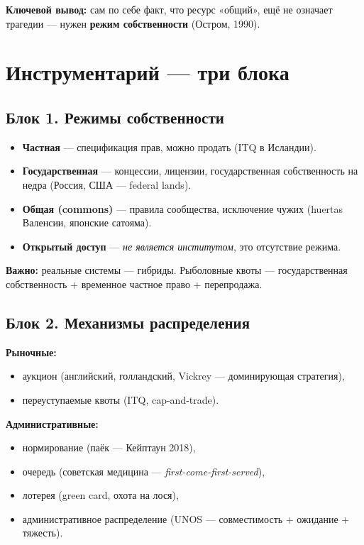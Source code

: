 \documentclass[12pt]{article}
\begin{document}
\textbf{Ключевой вывод:} сам по себе факт, что ресурс «общий», ещё не означает трагедии — нужен \textbf{режим собственности} (Остром, 1990).

\section{Инструментарий — три блока}

\subsection{Блок 1. Режимы собственности}
\begin{itemize}
\item \textbf{Частная} — спецификация прав, можно продать (ITQ в Исландии).
\item \textbf{Государственная} — концессии, лицензии, государственная собственность на недра (Россия, США — federal lands).
\item \textbf{Общая (commons)} — правила сообщества, исключение чужих (huertas Валенсии, японские сатояма).
\item \textbf{Открытый доступ} — \emph{не является институтом}, это отсутствие режима.
\end{itemize}

\textbf{Важно:} реальные системы — гибриды. Рыболовные квоты — государственная собственность + временное частное право + перепродажа.

\subsection{Блок 2. Механизмы распределения}
\textbf{Рыночные:}
\begin{itemize}
\item аукцион (английский, голландский, Vickrey — доминирующая стратегия),
\item переуступаемые квоты (ITQ, cap-and-trade).
\end{itemize}

\textbf{Административные:}
\begin{itemize}
\item нормирование (паёк — Кейптаун 2018),
\item очередь (советская медицина — \emph{first-come-first-served}),
\item лотерея (green card, охота на лося),
\item административное распределение (UNOS — совместимость + ожидание + тяжесть).
\end{itemize}
\end{document}
